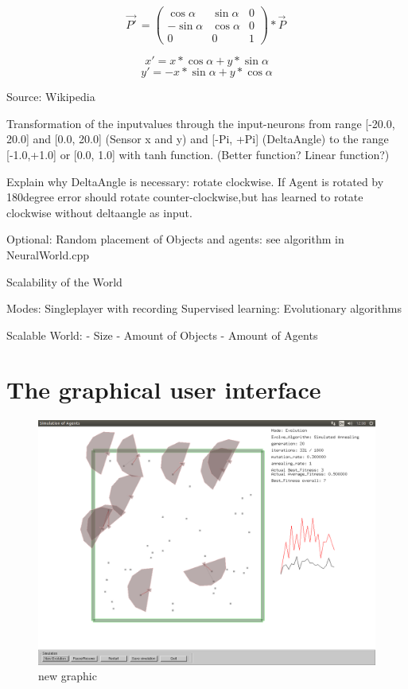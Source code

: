 \documentclass[10pt,a4paper,DIV=11]{scrreprt}
\begin{document}
\begin{equation}
\vec{P'}^{\,} =
\begin{pmatrix}
\cos \alpha & \sin \alpha & 0 \\
-\sin \alpha & \cos \alpha & 0 \\
0 & 0 & 1
\end{pmatrix}
* \vec{P}^{\,}
\end{equation}

\begin{equation}
x' = x * \cos \alpha + y * \sin \alpha
\end{equation}
\begin{equation}
y' = -x * \sin \alpha + y * \cos \alpha
\end{equation}

Source: Wikipedia


Transformation of the inputvalues through the input-neurons from range [-20.0, 20.0] and [0.0, 20.0] (Sensor x and y) and [-Pi, +Pi] (DeltaAngle) to the range [-1.0,+1.0] or [0.0, 1.0] with tanh function. (Better function? Linear function?)

Explain why DeltaAngle is necessary:
rotate clockwise. If Agent is rotated by 180degree error should rotate counter-clockwise,but
has learned to rotate clockwise without deltaangle as input.


Optional: Random placement of Objects and agents: see algorithm in NeuralWorld.cpp



Scalability of the World


Modes:
Singleplayer with recording
Supervised learning:
Evolutionary algorithms

Scalable World:
- Size
- Amount of Objects
- Amount of Agents

\section{The graphical user interface}


\begin{center}
	\begin{figure}[H]
		\centering
		\includegraphics[width=1.0\textwidth,scale=1.0]{files/new_graphic.png}  
		\caption{new graphic}
		\label{fig:cosys-transform}
	\end{figure}
\end{center}
\end{document}
